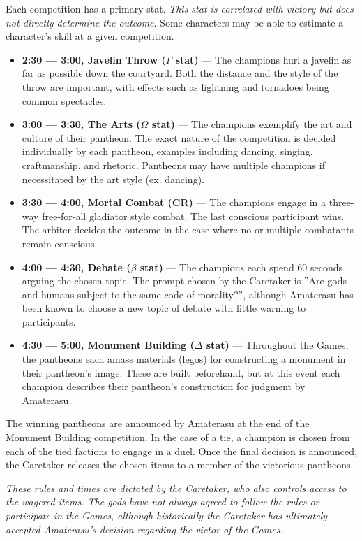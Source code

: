 \documentclass[green]{guardians}
\begin{document}
Each competition has a primary stat. \emph{This stat is correlated with victory but does not directly determine the outcome}. Some characters may be able to estimate a character's skill at a given competition.

\begin{itemize}
  \item \textbf{2:30 --- 3:00, Javelin Throw ($\Gamma$ stat)} --- The champions hurl a javelin as far as possible down the courtyard. Both the distance and the style of the throw are important, with effects such as lightning and tornadoes being common spectacles.
	\item \textbf{3:00 --- 3:30, The Arts ($\Omega$ stat)} --- The champions exemplify the art and culture of their pantheon. The exact nature of the competition is decided individually by each pantheon, examples including dancing, singing, craftmanship, and rhetoric. Pantheons may have multiple champions if necessitated by the art style (ex. dancing).
	\item \textbf{3:30 --- 4:00, Mortal Combat (CR)} --- The champions engage in a three-way free-for-all gladiator style combat. The last conscious participant wins. The arbiter decides the outcome in the case where no or multiple combatants remain conscious.
	\item \textbf{4:00 --- 4:30, Debate ($\beta$ stat)} --- The champions each spend 60 seconds arguing the chosen topic. The prompt chosen by the Caretaker is ''Are gods and humans subject to the same code of morality?'', although Amaterasu has been known to choose a new topic of debate with little warning to participants.
	\item \textbf{4:30 --- 5:00, Monument Building ($\Delta$ stat)} --- Throughout the Games, the pantheons each amass materials (legos) for constructing a monument in their pantheon's image. These are built beforehand, but at this event each champion describes their pantheon's construction for judgment by Amaterasu.
\end{itemize}

The winning pantheons are announced by Amaterasu at the end of the Monument Building competition. In the case of a tie, a champion is chosen from each of the tied factions to engage in a duel. Once the final decision is announced, the Caretaker releases the chosen items to a member of the victorious pantheons.

\emph{These rules and times are dictated by the Caretaker, who also controls access to the wagered items. The gods have not always agreed to follow the rules or participate in the Games, although historically the Caretaker has ultimately accepted Amaterasu's decision regarding the victor of the Games.}
\end{document}
